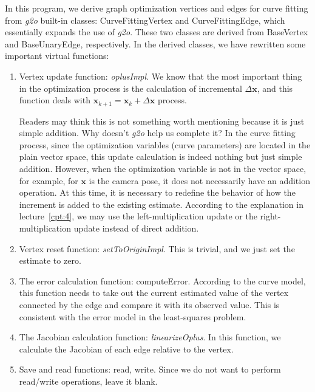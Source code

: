 In this program, we derive graph optimization vertices and edges for curve fitting from \textit{g2o} built-in classes: CurveFittingVertex and CurveFittingEdge, which essentially expands the use of \textit{g2o}. These two classes are derived from BaseVertex and BaseUnaryEdge, respectively. In the derived classes, we have rewritten some important virtual functions:
\begin{enumerate}
    \item Vertex update function: \textit{oplusImpl}. We know that the most important thing in the optimization process is the calculation of incremental $\Delta \mathbf{x}$, and this function deals with $\mathbf{x}_{k+1} = \mathbf{x}_k + \Delta \mathbf{x}$ process.

    Readers may think this is not something worth mentioning because it is just simple addition. Why doesn't \textit{g2o} help us complete it? In the curve fitting process, since the optimization variables (curve parameters) are located in the plain vector space, this update calculation is indeed nothing but just simple addition. However, when the optimization variable is not in the vector space, for example, for $\mathbf{x}$ is the camera pose, it does not necessarily have an addition operation. At this time, it is necessary to redefine the behavior of how the increment is added to the existing estimate. According to the explanation in lecture~\ref{cpt:4}, we may use the left-multiplication update or the right-multiplication update instead of direct addition.

    \item Vertex reset function: \textit{setToOriginImpl}. This is trivial, and we just set the estimate to zero.

    \item The error calculation function: computeError. According to the curve model, this function needs to take out the current estimated value of the vertex connected by the edge and compare it with its observed value. This is consistent with the error model in the least-squares problem.
    
    \item The Jacobian calculation function: \textit{linearizeOplus}. In this function, we calculate the Jacobian of each edge relative to the vertex.

    \item Save and read functions: read, write. Since we do not want to perform read/write operations, leave it blank.
\end{enumerate}

